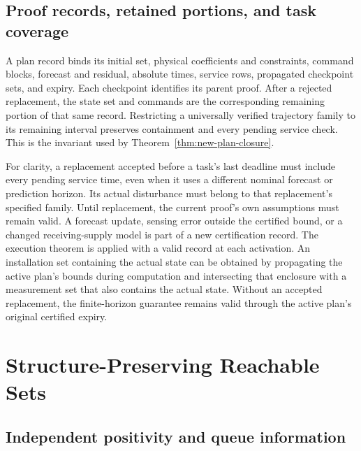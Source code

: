 \documentclass[preprint,12pt]{elsarticle}
\begin{document}
\subsection{Proof records, retained portions, and task coverage}

A plan record binds its initial set, physical coefficients and constraints,
command blocks, forecast and residual, absolute times, service rows,
propagated checkpoint sets, and expiry. Each checkpoint identifies its
parent proof. After a rejected replacement, the state set and commands are the corresponding
remaining portion of that same record. Restricting a universally
verified trajectory family to its remaining interval preserves containment
and every pending service check. This is the invariant used by
Theorem~\ref{thm:new-plan-closure}.

For clarity, a replacement accepted before a task's last deadline must
include every pending service time, even when it uses a different nominal
forecast or prediction horizon. Its actual disturbance must belong to that
replacement's specified family. Until replacement, the current proof's own
assumptions must remain valid. A forecast update, sensing error outside the
certified bound, or a changed receiving-supply model is part of a new
certification record. The execution theorem is applied with a valid record
at each activation. An installation set containing the actual state can be obtained by
propagating the active plan's bounds during computation and intersecting
that enclosure with a measurement set that also contains the actual state. Without an accepted replacement, the finite-horizon guarantee remains
valid through the active plan's original certified expiry.

\section{Structure-Preserving Reachable Sets}
\label{app:structure-proof}

\subsection{Independent positivity and queue information}
\end{document}
